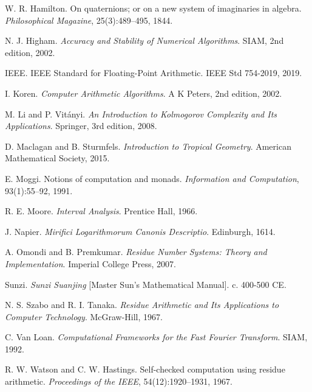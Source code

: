\documentclass[11pt]{article}
\theoremstyle{definition}
\begin{document}
\begin{thebibliography}{99}
W. R. Hamilton.
\newblock On quaternions; or on a new system of imaginaries in algebra.
\newblock \emph{Philosophical Magazine}, 25(3):489--495, 1844.

N. J. Higham.
\newblock \emph{Accuracy and Stability of Numerical Algorithms}.
\newblock SIAM, 2nd edition, 2002.

IEEE.
\newblock IEEE Standard for Floating-Point Arithmetic.
\newblock IEEE Std 754-2019, 2019.

I. Koren.
\newblock \emph{Computer Arithmetic Algorithms}.
\newblock A K Peters, 2nd edition, 2002.

M. Li and P. Vit\'anyi.
\newblock \emph{An Introduction to Kolmogorov Complexity and Its Applications}.
\newblock Springer, 3rd edition, 2008.

D. Maclagan and B. Sturmfels.
\newblock \emph{Introduction to Tropical Geometry}.
\newblock American Mathematical Society, 2015.

E. Moggi.
\newblock Notions of computation and monads.
\newblock \emph{Information and Computation}, 93(1):55--92, 1991.

R. E. Moore.
\newblock \emph{Interval Analysis}.
\newblock Prentice Hall, 1966.

J. Napier.
\newblock \emph{Mirifici Logarithmorum Canonis Descriptio}.
\newblock Edinburgh, 1614.

A. Omondi and B. Premkumar.
\newblock \emph{Residue Number Systems: Theory and Implementation}.
\newblock Imperial College Press, 2007.

Sunzi.
\newblock \emph{Sunzi Suanjing} [Master Sun's Mathematical Manual].
\newblock c. 400-500 CE.

N. S. Szabo and R. I. Tanaka.
\newblock \emph{Residue Arithmetic and Its Applications to Computer Technology}.
\newblock McGraw-Hill, 1967.

C. Van Loan.
\newblock \emph{Computational Frameworks for the Fast Fourier Transform}.
\newblock SIAM, 1992.

R. W. Watson and C. W. Hastings.
\newblock Self-checked computation using residue arithmetic.
\newblock \emph{Proceedings of the IEEE}, 54(12):1920--1931, 1967.


\end{thebibliography}
\end{document}
